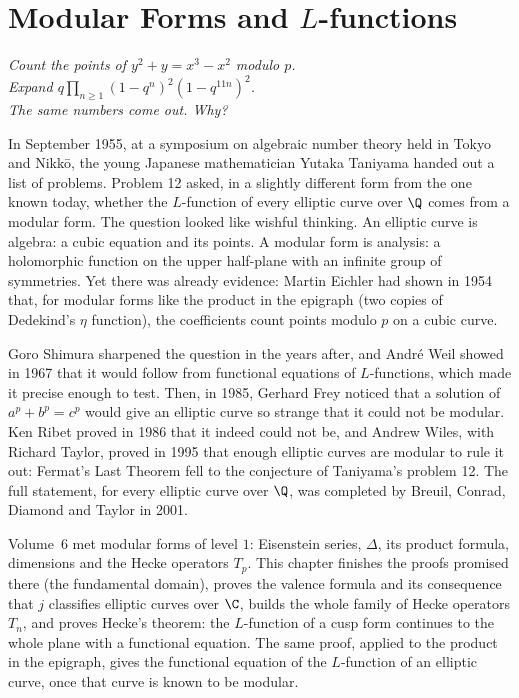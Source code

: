 \chapter{Modular Forms and $L$-functions}
\begin{center}\itshape
Count the points of $y^2+y=x^3-x^2$ modulo $p$.\\
Expand $q\prod_{n\ge1}(1-q^n)^2(1-q^{11n})^2$.\\
The same numbers come out. Why?
\end{center}

In September 1955, at a symposium on algebraic number theory held in Tokyo and Nikk\=o, the young Japanese mathematician Yutaka Taniyama handed out a
list of problems. Problem 12 asked, in a slightly different form from the one known today, whether the $L$-function of every elliptic curve over $\Q$ comes from a
modular form. The question looked like wishful thinking. An elliptic curve is algebra: a cubic equation and its points. A modular form is analysis: a holomorphic
function on the upper half-plane with an infinite group of symmetries. Yet there was already evidence: Martin Eichler had shown in 1954 that, for modular forms like the product in the epigraph (two copies of Dedekind's
$\eta$ function), the coefficients count points modulo $p$ on a cubic curve.

Goro Shimura sharpened the question in the years after, and Andr\'e Weil showed in 1967 that it would follow from functional equations of $L$-functions, which made
it precise enough to test. Then, in 1985, Gerhard Frey noticed that a solution of $a^p+b^p=c^p$ would give an elliptic curve so strange that it could not be modular.
Ken Ribet proved in 1986 that it indeed could not be, and Andrew Wiles, with Richard Taylor, proved in 1995 that enough elliptic curves are modular to rule it out:
Fermat's Last Theorem fell to the conjecture of Taniyama's problem 12. The full statement, for every elliptic curve over $\Q$, was completed by Breuil, Conrad,
Diamond and Taylor in 2001.

Volume~6 met modular forms of level $1$: Eisenstein series, $\Delta$, its product formula, dimensions and the Hecke operators $T_p$. This chapter finishes the
proofs promised there (the fundamental domain), proves the valence formula and its consequence that $j$ classifies elliptic curves over $\C$, builds the whole
family of Hecke operators $T_n$, and proves Hecke's theorem: the $L$-function of a cusp form continues to the whole plane with a functional equation. The same
proof, applied to the product in the epigraph, gives the functional equation of the $L$-function of an elliptic curve, once that curve is known to be modular.

